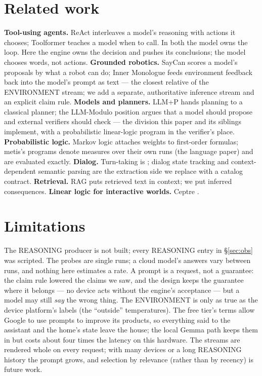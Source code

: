 \documentclass[11pt]{article}
\begin{document}
\section{Related work}\label{sec:related}

\textbf{Tool-using agents.} ReAct \cite{yao2023react} interleaves a model's reasoning with
actions it chooses; Toolformer \cite{schick2023toolformer} teaches a model when to call. In
both the model owns the loop. Here the engine owns the decision and pushes its conclusions;
the model chooses words, not actions. \textbf{Grounded robotics.} SayCan \cite{ahn2022saycan}
scores a model's proposals by what a robot can do; Inner Monologue \cite{huang2022inner}
feeds environment feedback back into the model's prompt as text --- the closest relative of
the ENVIRONMENT stream; we add a separate, authoritative inference stream and an explicit
claim rule. \textbf{Models and planners.} LLM+P \cite{liu2023llmp} hands planning to a
classical planner; the LLM-Modulo position \cite{kambhampati2024llmmodulo} argues that a model
should propose and external verifiers should check --- the division this paper and its
siblings implement, with a probabilistic linear-logic program \cite{girard1987linear} in the
verifier's place. \textbf{Probabilistic logic.} Markov logic \cite{richardson2006mln} attaches
weights to first-order formulas; metis's programs denote measures over their own runs
(the language paper) and are evaluated exactly. \textbf{Dialog.} Turn-taking is
\cite{raux2009fsttm}; dialog state tracking \cite{williams2016dstc} and context-dependent
semantic parsing \cite{suhr2018context} are the extraction side we replace with a catalog
contract. \textbf{Retrieval.} RAG \cite{lewis2020rag} puts retrieved text in context; we put
inferred consequences. \textbf{Linear logic for interactive worlds.} Ceptre
\cite{martens2015ceptre}.

\section{Limitations}\label{sec:limits}

The REASONING producer is not built; every REASONING entry in \S\ref{sec:obs} was scripted.
The probes are single runs; a cloud model's answers vary between runs, and nothing here
estimates a rate. A prompt is a request, not a guarantee: the claim rule lowered the claims
we saw, and the design keeps the guarantee where it belongs --- no device acts without the
engine's acceptance --- but a model may still \emph{say} the wrong thing. The ENVIRONMENT is
only as true as the device platform's labels (the ``outside'' temperatures). The free tier's
terms allow Google to use prompts to improve its products, so everything said to the
assistant and the home's state leave the house; the local Gemma path keeps them in but costs
about four times the latency on this hardware. The streams are rendered whole on every
request; with many devices or a long REASONING history the prompt grows, and selection by
relevance (rather than by recency) is future work.
\end{document}
